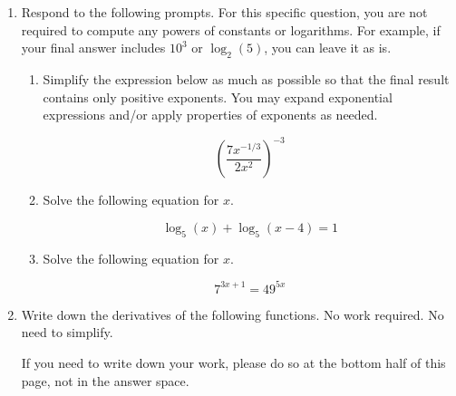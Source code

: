 \documentclass[11pt]{article}
\begin{document}
\begin{enumerate}
\item Respond to the following prompts. For this specific question, you are not required to compute any powers of constants or logarithms. For example, if your final answer includes $10^3$ or $\log_2(5)$, you can leave it as is.

\begin{enumerate}
    \item Simplify the expression below as much as possible so that the final result contains only positive exponents. You may expand exponential expressions and/or apply properties of exponents as needed. 

        \[
            \left(\frac{7x^{-1/3}}{2x^2}\right)^{-3}
        \]

    \vfill

    \item Solve the following equation for $x$. 

    \[\log_{5}(x) + \log_{5}(x - 4) = 1\]

    \vfill
     \item Solve the following equation for $x$. 

    \[7^{3x + 1} = 49^{5x}\]

    \vfill
\end{enumerate}



\newpage


\item Write down the derivatives of the following functions. No work required. No need to simplify.

If you need to write down your work, please do so at the bottom half of this page, not in the answer space.


\end{enumerate}
\end{document}
